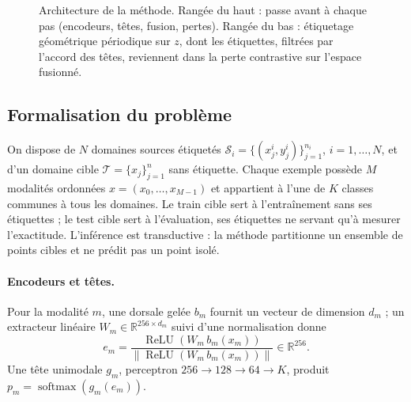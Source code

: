 \documentclass[11pt,a4paper]{article}
\theoremstyle{definition}
\theoremstyle{remark}
\newcommand{\norm}[1]{\left\lVert #1 \right\rVert}
\newcommand{\R}{\mathbb{R}}
\DeclareMathOperator*{\argmax}{arg\,max}
\DeclareMathOperator{\softmax}{softmax}
\DeclareMathOperator{\ReLU}{ReLU}
\newcommand{\Src}{\mathcal{S}}
\newcommand{\Tgt}{\mathcal{T}}
\newcommand{\Pcal}{\mathcal{P}}
\begin{document}
\begin{figure}[ht]
{%
}
\caption{Architecture de la méthode. Rangée du haut : passe avant à chaque pas (encodeurs, têtes, fusion, pertes).
  Rangée du bas : étiquetage géométrique périodique sur $z$, dont les étiquettes, filtrées par l'accord des têtes,
  reviennent dans la perte contrastive sur l'espace fusionné.}\label{fig-architecture}
\end{figure}

\subsection{Formalisation du problème}\label{sec-formalisation}

On dispose de $N$ domaines sources étiquetés $\Src_i = \{(x^i_j, y^i_j)\}_{j=1}^{n_i}$, $i = 1, \dots, N$, et d'un
domaine cible $\Tgt = \{x_j\}_{j=1}^{n}$ sans étiquette. Chaque exemple possède $M$ modalités ordonnées
$x = (x_0, \dots, x_{M-1})$ et appartient à l'une de $K$ classes communes à tous les domaines. Le train cible sert à
l'entraînement sans ses étiquettes ; le test cible sert à l'évaluation, ses étiquettes ne servant qu'à mesurer
l'exactitude. L'inférence est transductive : la méthode partitionne un ensemble de points cibles et ne prédit pas un
point isolé.

\paragraph{Encodeurs et têtes.}
Pour la modalité $m$, une dorsale gelée $b_m$ fournit un vecteur de dimension $d_m$ ; un extracteur linéaire
$W_m \in \R^{256 \times d_m}$ suivi d'une normalisation donne
\begin{equation}\label{eq-encodeur}
  e_m = \frac{\ReLU(W_m\, b_m(x_m))}{\norm{\ReLU(W_m\, b_m(x_m))}} \in \R^{256}.
\end{equation}
Une tête unimodale $g_m$, perceptron $256 \to 128 \to 64 \to K$, produit $p_m = \softmax(g_m(e_m))$.
\end{document}
